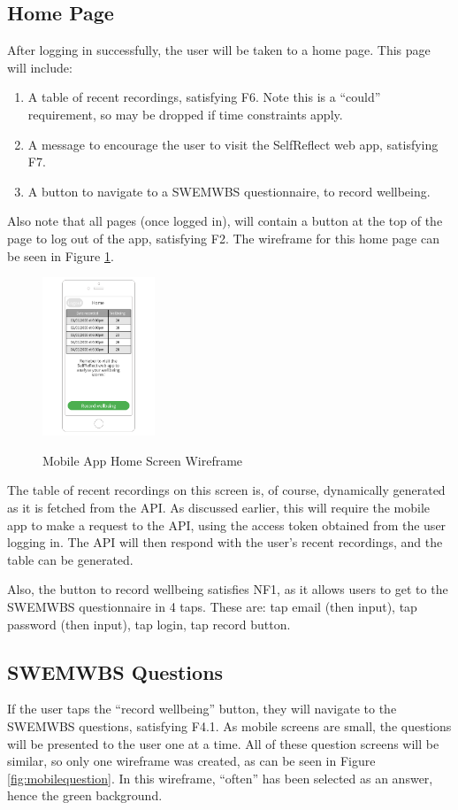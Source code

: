 \documentclass[11pt,openright,a4paper]{report}
\begin{document}
\subsection{Home Page}
After logging in successfully, the user will be taken to a home page. This page will include:
\begin{enumerate}
\item A table of recent recordings, satisfying F6. Note this is a \enquote{could} requirement, so may be dropped if time constraints apply.
\item A message to encourage the user to visit the SelfReflect web app, satisfying F7.
\item A button to navigate to a SWEMWBS questionnaire, to record wellbeing.
\end{enumerate}

Also note that all pages (once logged in), will contain a button at the top of the page to log out of the app, satisfying F2. The wireframe for this home page can be seen in Figure \ref{fig:mobilehome}.

\begin{figure}[ht]
\centering
\caption{Mobile App Home Screen Wireframe}
\includegraphics[width=0.3\textwidth]{i/mobilehome.png}
\label{fig:mobilehome}
\end{figure}

The table of recent recordings on this screen is, of course, dynamically generated as it is fetched from the API. As discussed earlier, this will require the mobile app to make a request to the API, using the access token obtained from the user logging in. The API will then respond with the user's recent recordings, and the table can be generated.

Also, the button to record wellbeing satisfies NF1, as it allows users to get to the SWEMWBS questionnaire in 4 taps. These are: tap email (then input), tap password (then input), tap login, tap record button.

\subsection{SWEMWBS Questions}
If the user taps the \enquote{record wellbeing} button, they will navigate to the SWEMWBS questions, satisfying F4.1. As mobile screens are small, the questions will be presented to the user one at a time. All of these question screens will be similar, so only one wireframe was created, as can be seen in Figure \ref{fig:mobilequestion}. In this wireframe, \enquote{often} has been selected as an answer, hence the green background.
\end{document}
